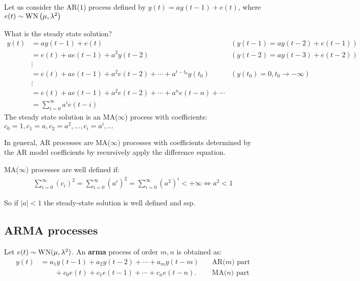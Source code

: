 \begin{example}
Let us consider the AR($1$) process defined by $y(t)=a y(t-1)+e(t)$, where $e(t) \sim \operatorname{WN}\left(\mu, \lambda^{2}\right)$

What is the steady state solution?
\begin{align*}
	y(t) & =a y(t-1)+e(t) & (y(t-1)=a y(t-2)+e(t-1)) \\
	& =e(t)+a e(t-1)+a^{2} y(t-2) & (y(t-2)=a y(t-3)+e(t-2)) \\
	& \vdots & \\
	& =e(t)+a e(t-1)+a^{2} e(t-2)+\cdots+a^{t-t_{0}} y\left(t_{0}\right) & (y\left(t_{0}\right)=0,t_{0} \to-\infty) \\
	& \vdots & \\
	& =e(t)+a e(t-1)+a^{2} e(t-2)+\cdots+a^{n} e(t-n)+\cdots\\
	&=\sum_{i=0}^{\infty} a^{i} e(t-i)
\end{align*}
The steady state solution is an MA($\infty$) process with coefficients: $c_{0}=1, c_{1}=a, c_{2}=a^{2}, \ldots, c_{i}=a^{i}, \ldots$

In general, AR processes are MA($\infty$) processes with coefficients determined by the AR model coefficients by recursively apply the difference equation.

MA($\infty$) processes are well defined if:
\begin{align*}
	\sum_{i=0}^{\infty} \left(c_{i}\right)^2=\sum_{i=0}^{\infty} \left(a^{i}\right)^2=\sum_{i=0}^{\infty} \left(a^{2}\right)^i< +\infty \iff a^2< 1
\end{align*}

So if $|a|<1$ the steady-state solution is well defined and \gls{ssp}.
\end{example}

\subsection{ARMA processes}

\begin{definition}
	Let $e(t) \sim \operatorname{WN}(\mu, \lambda^{2})$. An \textbf{\gls{arma}} process of order $m,n$ is obtained as:
	\[
		\boxed{
			\begin{aligned}
				y(t)&=a_{1} y(t-1)+a_{2} y(t-2)+\cdots+a_{m} y(t-m)\quad & \text{AR($m$) part}\\
				&\qquad+c_{0} e(t)+c_{1} e(t-1)+\cdots+c_{n} e(t-n) . \quad & \text{MA($n$) part}
			\end{aligned}
		}
	\]
\end{definition}

